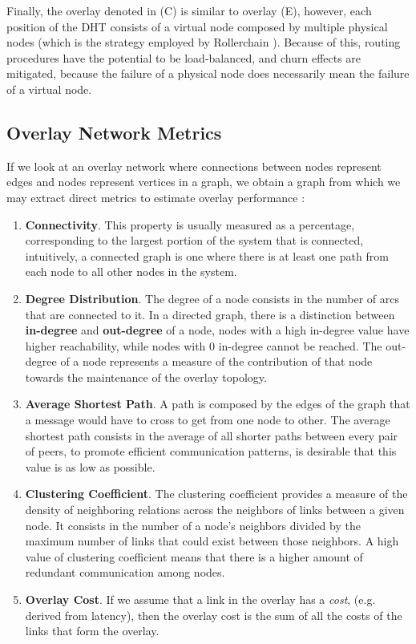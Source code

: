 Finally, the overlay denoted in (C) is similar to overlay (E), however, each position of the DHT consists of a virtual node composed by multiple physical nodes (which is the strategy employed by Rollerchain \cite{rollerchain}). Because of this, routing procedures have the potential to be load-balanced, and churn effects are mitigated, because the failure of a physical node does necessarily mean the failure of a virtual node. 
 
\subsection{Overlay Network Metrics}

If we look at an overlay network where connections between nodes represent edges and nodes represent vertices in a graph, we obtain a graph from which we may extract direct metrics to estimate overlay performance \cite{leitaoPHDthesis}:

\begin{enumerate}
    
    \item \textbf{Connectivity}. This property is usually measured as a percentage, corresponding to the largest portion of the system that is connected, intuitively, a connected graph is one where there is at least one path from each node to all other nodes in the system.
    
    \item \textbf{Degree Distribution}. The degree of a node consists in the number of arcs that are connected to it. In a directed graph, there is a distinction between \textbf{in-degree} and \textbf{out-degree} of a node, nodes with a high in-degree value have higher reachability, while nodes with 0 in-degree cannot be reached. The out-degree of a node represents a measure of the contribution of that node towards the maintenance of the overlay topology.
    
    \item \textbf{Average Shortest Path}. A path is composed by the edges of the graph that a message would have to cross to get from one node to other. The average shortest path consists in the average of all shorter paths between every pair of peers, to promote efficient communication patterns, is desirable that this value is as low as possible.
    
    \item \textbf{Clustering Coefficient}. The clustering coefficient provides a measure of the density of neighboring relations across the neighbors of links between a given node. It consists in the number of a node's neighbors divided by the maximum number of links that could exist between those neighbors. A high value of clustering coefficient means that there is a higher amount of redundant communication among nodes.
    
    \item \textbf{Overlay Cost}. If we assume that a link in the overlay has a \textit{cost}, (e.g. derived from latency), then the overlay cost is the sum of all the costs of the links that form the overlay. 
    
\end{enumerate}

